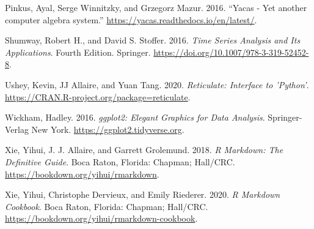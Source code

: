 \begin{CSLReferences}{1}{0}
\leavevmode{}%
Pinkus, Ayal, Serge Winnitzky, and Grzegorz Mazur. 2016. {``{Yacas - Yet another computer algebra system}.''} \url{https://yacas.readthedocs.io/en/latest/}.

\leavevmode{}%
Shumway, Robert H., and David S. Stoffer. 2016. \emph{Time Series Analysis and Its Applications}. Fourth Edition. Springer. \url{https://doi.org/10.1007/978-3-319-52452-8}.

\leavevmode{}%
Ushey, Kevin, JJ Allaire, and Yuan Tang. 2020. \emph{Reticulate: Interface to 'Python'}. \url{https://CRAN.R-project.org/package=reticulate}.

\leavevmode{}%
Wickham, Hadley. 2016. \emph{{g}gplot2: Elegant Graphics for Data Analysis}. Springer-Verlag New York. \url{https://ggplot2.tidyverse.org}.

\leavevmode{}%
Xie, Yihui, J. J. Allaire, and Garrett Grolemund. 2018. \emph{R Markdown: The Definitive Guide}. Boca Raton, Florida: Chapman; Hall/{CRC}. \url{https://bookdown.org/yihui/rmarkdown}.

\leavevmode{}%
Xie, Yihui, Christophe Dervieux, and Emily Riederer. 2020. \emph{R Markdown Cookbook}. Boca Raton, Florida: Chapman; Hall/{CRC}. \url{https://bookdown.org/yihui/rmarkdown-cookbook}.

\end{CSLReferences}


\address{%
Mikkel Meyer Andersen\\
Department of Mathematical Sciences, Aalborg University, Denmark\\%
Skjernvej 4A\\ 9220 Aalborg Ø, Denmark\\
%
%
\textit{ORCiD: \href{https://orcid.org/0000-0002-0234-0266}{0000-0002-0234-0266}}\\%
\href{mailto:mikl@math.aau.dk}{\nolinkurl{mikl@math.aau.dk}}%
}

\address{%
Søren Højsgaard\\
Department of Mathematical Sciences, Aalborg University, Denmark\\%
Skjernvej 4A\\ 9220 Aalborg Ø, Denmark\\
%
%
\textit{ORCiD: \href{https://orcid.org/0000-0002-3269-9552}{0000-0002-3269-9552}}\\%
\href{mailto:sorenh@math.aau.dk}{\nolinkurl{sorenh@math.aau.dk}}%
}
